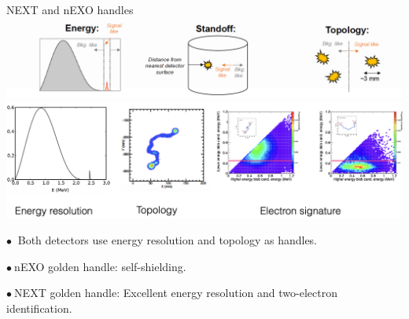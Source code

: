 \documentclass [aspectratio=169]{beamer}
\begin{document}
\begin{frame}{NEXT and nEXO handles}
\includegraphics[scale=0.30]{nexoHandles.png}
\includegraphics[scale=0.30]{nextSignatures.png}

$\bullet~$ Both detectors use energy resolution and topology as handles. 
 
 $\bullet~$nEXO golden handle: self-shielding.
 
 $\bullet~$NEXT  golden handle: Excellent energy resolution and two-electron identification. 
   
\end{frame}



%
%
% 
% 
% 
% 
% 



\end{document}
